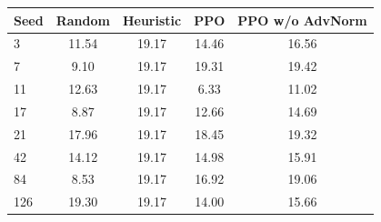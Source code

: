 \begin{tabular}{lcccc}
\toprule
Seed & Random & Heuristic & PPO & PPO w/o AdvNorm \\
\midrule
3 & 11.54 & 19.17 & 14.46 & 16.56 \\
7 & 9.10 & 19.17 & 19.31 & 19.42 \\
11 & 12.63 & 19.17 & 6.33 & 11.02 \\
17 & 8.87 & 19.17 & 12.66 & 14.69 \\
21 & 17.96 & 19.17 & 18.45 & 19.32 \\
42 & 14.12 & 19.17 & 14.98 & 15.91 \\
84 & 8.53 & 19.17 & 16.92 & 19.06 \\
126 & 19.30 & 19.17 & 14.00 & 15.66 \\
\bottomrule
\end{tabular}
